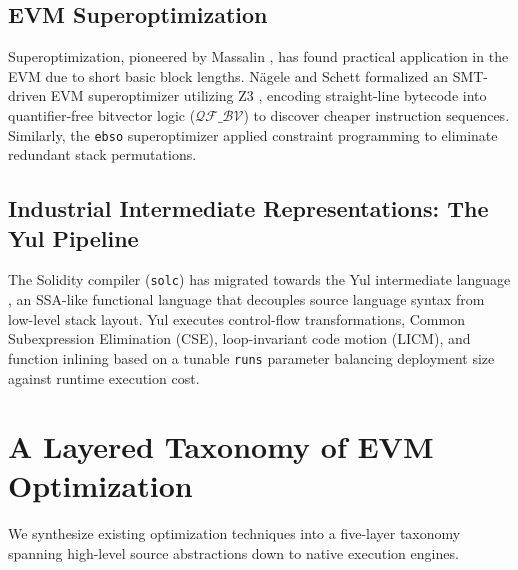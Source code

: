 \documentclass[conference]{IEEEtran}
\begin{document}
\subsection{EVM Superoptimization}
Superoptimization, pioneered by Massalin \cite{massalin1987superoptimizer}, has found practical application in the EVM due to short basic block lengths. N{\"a}gele and Schett \cite{nagele2020blockchain} formalized an SMT-driven EVM superoptimizer utilizing Z3 \cite{demoura2008z3}, encoding straight-line bytecode into quantifier-free bitvector logic ($\mathcal{QF\_BV}$) to discover cheaper instruction sequences. Similarly, the \texttt{ebso} superoptimizer applied constraint programming to eliminate redundant stack permutations.

\subsection{Industrial Intermediate Representations: The Yul Pipeline}
The Solidity compiler (\texttt{solc}) has migrated towards the Yul intermediate language \cite{soliditydocs}, an SSA-like functional language that decouples source language syntax from low-level stack layout. Yul executes control-flow transformations, Common Subexpression Elimination (CSE), loop-invariant code motion (LICM), and function inlining based on a tunable \texttt{runs} parameter balancing deployment size against runtime execution cost.

\section{A Layered Taxonomy of EVM Optimization}
We synthesize existing optimization techniques into a five-layer taxonomy spanning high-level source abstractions down to native execution engines.
\end{document}
